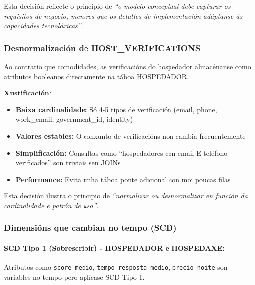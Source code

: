 \documentclass[12pt,a4paper]{article}
\begin{document}
Esta decisión reflecte o principio de \emph{``o modelo conceptual debe capturar os requisitos de negocio, mentres que os detalles de implementación adáptanse ás capacidades tecnolóxicas''}.

\subsubsection{Desnormalización de HOST\_VERIFICATIONS}

Ao contrario que comodidades, as verificacións do hospedador almacénanse como atributos booleanos directamente na táboa HOSPEDADOR.

\textbf{Xustificación:}
\begin{itemize}
    \item \textbf{Baixa cardinalidade:} Só 4-5 tipos de verificación (email, phone, work\_email, government\_id, identity)
    \item \textbf{Valores estables:} O conxunto de verificacións non cambia frecuentemente
    \item \textbf{Simplificación:} Consultas como ``hospedadores con email E teléfono verificados'' son triviais sen JOINs
    \item \textbf{Performance:} Evita unha táboa ponte adicional con moi poucas filas
\end{itemize}

Esta decisión ilustra o principio de \emph{``normalizar ou desnormalizar en función da cardinalidade e patrón de uso''}.

\subsubsection{Dimensións que cambian no tempo (SCD)}

\paragraph{SCD Tipo 1 (Sobrescribir) - HOSPEDADOR e HOSPEDAXE:}

Atributos como \texttt{score\_medio}, \texttt{tempo\_resposta\_medio}, \texttt{precio\_noite} son variables no tempo pero aplícase SCD Tipo 1.
\end{document}
